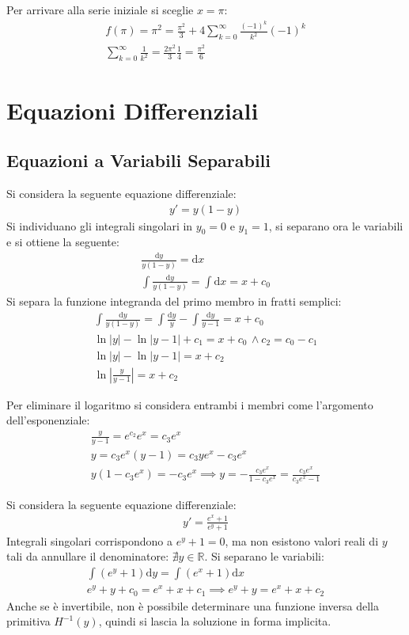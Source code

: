 \documentclass{article}
\newcommand{\df}{\mathrm{d}}
\numberwithin{equation}{subsection}
\begin{document}
Per arrivare alla serie iniziale si sceglie $x=\pi$:
\begin{gather*}
    f(\pi)=\pi^2=\frac{\pi^2}{3}+4\sum_{k=0}^\infty\frac{(-1)^k}{k^2}(-1)^k\\
    \sum_{k=0}^\infty\frac{1}{k^2}=\frac{2\pi^2}{3}\frac{1}{4}=\frac{\pi^2}{6}
\end{gather*}

\clearpage

\section{Equazioni Differenziali}

\subsection{Equazioni a Variabili Separabili}

Si considera la seguente equazione differenziale:
\begin{gather*}
    y'=y(1-y)
\end{gather*}
Si individuano gli integrali singolari in $y_0=0$ e $y_1=1$, si separano ora le variabili e si ottiene la seguente:
\begin{gather*}
    \displaystyle\frac{\df y}{y(1-y)}=\df x\\
    \displaystyle\int \frac{\df y}{y(1-y)}=\int \df x=x+c_0
\end{gather*}
Si separa la funzione integranda del primo membro in fratti semplici:
\begin{gather*}
    \displaystyle\int\frac{\df y}{y(1-y)}=\int\frac{\df y}{y}-\int\frac{\df y}{y-1}=x+c_0\\
    \ln|y|-\ln|y-1|+c_1=x+c_0\,\land c_2=c_0-c_1\\
    \ln|y|-\ln|y-1|=x+c_2\\
    \ln\left|\displaystyle\frac{y}{y-1}\right|=x+c_2
\end{gather*}

Per eliminare il logaritmo si considera entrambi i membri come l'argomento dell'esponenziale:
\begin{gather*}
    \displaystyle\frac{y}{y-1}=e^{c_2}e^x=c_3e^x\\
    y=c_3e^x(y-1)=c_3ye^x-c_3e^x\\
    y(1-c_3e^x)=-c_3e^x\implies y=-\frac{c_3e^x}{1-c_3e^x}=\frac{c_3e^x}{c_3e^x-1}
\end{gather*}


Si considera la seguente equazione differenziale:
\begin{gather*}
    y'=\displaystyle\frac{e^x+1}{e^y+1}
\end{gather*}
Integrali singolari corrispondono a $e^y+1=0$, ma non esistono valori reali di $y$ tali da annullare il denominatore: $\nexists y\in\mathbb{R}$. 
Si separano le variabili:
\begin{gather*}
    \displaystyle\int(e^y+1)\df y=\int (e^x+1)\df x\\
    e^y+y+c_0=e^x+x+c_1\implies e^y+y=e^x+x+c_2
\end{gather*} 
Anche se è invertibile, non è possibile determinare una funzione inversa della primitiva $H^{-1}(y)$, quindi si lascia la soluzione in forma implicita. 
\end{document}
